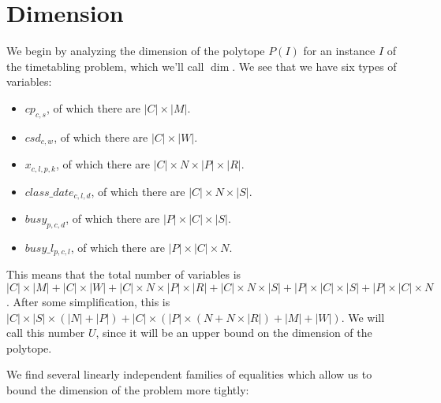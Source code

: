 \section{Dimension}

We begin by analyzing the dimension of the polytope $P(I)$ for an instance $I$ of the timetabling problem, which we'll call $\dim$. We see that we have six types of variables:
\begin{itemize}
\item $cp_{c, s}$, of which there are $|C| \times |M|$.
\item $csd_{c, w}$, of which there are $|C| \times |W|$.
\item $x_{c, l, p, k}$, of which there are $|C| \times N \times |P| \times |R|$.
\item $class\_date_{c, l, d}$, of which there are $|C| \times N \times |S|$.
\item $busy_{p, c, d}$, of which there are $|P| \times |C| \times |S|$.
\item $busy\_l_{p, c, l}$, of which there are $|P| \times |C| \times N$.
\end{itemize}

This means that the total number of variables is $|C| \times |M| + |C| \times |W| + |C| \times N \times |P| \times |R| + |C| \times N \times |S| + |P| \times |C| \times |S| + |P| \times |C| \times N$. After some simplification, this is $|C| \times |S| \times (|N| + |P|) + |C| \times (|P| \times (N + N \times |R|) +|M| + |W|)$. We will call this number $U$, since it will be an upper bound on the dimension of the polytope.


We find several linearly independent families of equalities which allow us to bound the dimension of the problem more tightly:

